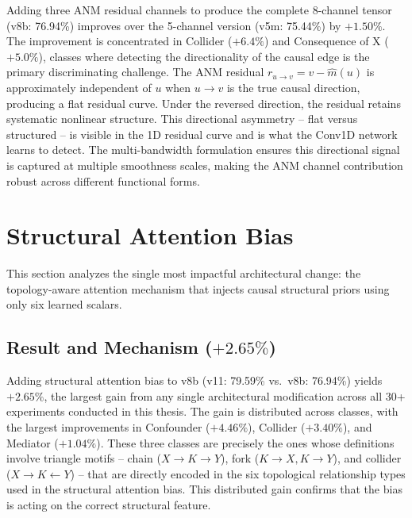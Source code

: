 Adding three ANM residual channels to produce the complete 8-channel tensor (v8b: 76.94\%) improves over the 5-channel version (v5m: 75.44\%) by $+1.50\%$. The improvement is concentrated in Collider ($+6.4\%$) and Consequence of X ($+5.0\%$), classes where detecting the directionality of the causal edge is the primary discriminating challenge. The ANM residual $r_{u \to v} = v - \hat{m}(u)$ is approximately independent of $u$ when $u \to v$ is the true causal direction, producing a flat residual curve. Under the reversed direction, the residual retains systematic nonlinear structure. This directional asymmetry -- flat versus structured -- is visible in the 1D residual curve and is what the Conv1D network learns to detect. The multi-bandwidth formulation ensures this directional signal is captured at multiple smoothness scales, making the ANM channel contribution robust across different functional forms.

\section{Structural Attention Bias}
\label{sec:struct_results}

This section analyzes the single most impactful architectural change: the topology-aware attention mechanism that injects causal structural priors using only six learned scalars.

\subsection{Result and Mechanism ($+2.65\%$)}

Adding structural attention bias to v8b (v11: 79.59\% vs.\ v8b: 76.94\%) yields $+2.65\%$, the largest gain from any single architectural modification across all 30+ experiments conducted in this thesis. The gain is distributed across classes, with the largest improvements in Confounder ($+4.46\%$), Collider ($+3.40\%$), and Mediator ($+1.04\%$). These three classes are precisely the ones whose definitions involve triangle motifs -- chain ($X \to K \to Y$), fork ($K \to X, K \to Y$), and collider ($X \to K \leftarrow Y$) -- that are directly encoded in the six topological relationship types used in the structural attention bias. This distributed gain confirms that the bias is acting on the correct structural feature.

